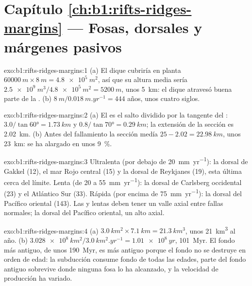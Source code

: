 \section*{Capítulo \ref{ch:b1:rifts-ridges-margins} --- Fosas, dorsales y márgenes pasivos}

\begin{solution}{exo:b1:rifts-ridges-margins:1}
(a) El dique cubriría en planta $\qty{60000}{m}\times\qty{8}{m} = \qty{4.8e5}{m^2}$, así que su altura media sería
$\qty{2.5e9}{m^3}/\qty{4.8e5}{m^2} =
\qty{5200}{m}$, unos \qty{5}{km}: el dique atravesó buena parte de la .
(b) $\qty{8}{m}/\qty{0.018}{m.yr^{-1}} = 444$ años, unos cuatro siglos.
\end{solution}

\begin{solution}{exo:b1:rifts-ridges-margins:2}
(a) El  es el salto dividido por la tangente del :
$3.0/\tan\ang{60} = \qty{1.73}{km}$ y $0.8/\tan\ang{70} = \qty{0.29}{km}$;
la extensión de la sección es \qty{2.02}{km}. (b) Antes del fallamiento la
sección medía $25 - 2.02 = \qty{22.98}{km}$, unos \qty{23}{km}: se ha alargado en
unos \qty{9}{\percent}.
\end{solution}

\begin{solution}{exo:b1:rifts-ridges-margins:3}
Ultralenta (por debajo de \qty{20}{mm.yr^{-1}}): la dorsal de Gakkel (12), el mar Rojo central
(15) y la dorsal de Reykjanes (19), esta última cerca del límite. Lenta (de 20 a
\qty{55}{mm.yr^{-1}}): la dorsal de Carlsberg occidental (23) y el Atlántico Sur (33).
Rápida (por encima de \qty{75}{mm.yr^{-1}}): la dorsal del Pacífico oriental (143). Las
 y lentas deben tener un valle axial entre fallas normales; la
dorsal del Pacífico oriental, un alto axial.
\end{solution}

\begin{solution}{exo:b1:rifts-ridges-margins:4}
(a) $\qty{3.0}{km^2}\times\qty{7.1}{km} = \qty{21.3}{km^3}$, unos
\qty{21}{km^3} al año. (b) $\qty{3.028e8}{km^2}/\qty{3.0}{km^2.yr^{-1}} =
\qty{1.01e8}{yr}$, \qty{101}{Myr}. El fondo más antiguo, de unos \qty{190}{Myr}, es
más antiguo porque el fondo no se destruye en orden de edad: la subducción consume
fondo de todas las edades, parte del fondo antiguo sobrevive donde ninguna fosa lo ha alcanzado,
y la velocidad de producción ha variado.
\end{solution}

